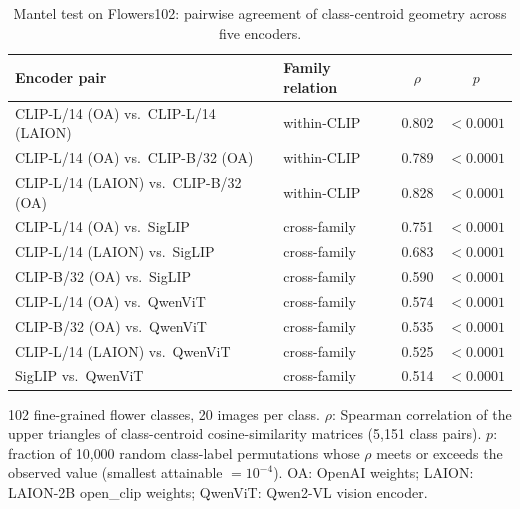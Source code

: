 \documentclass[a4paper,fleqn]{cas-sc}
\begin{document}
\begin{table}[h]
\centering
\caption{Mantel test on Flowers102: pairwise agreement of class-centroid geometry across five encoders.}
\label{tab:flowers102}
\small
\begin{tabular}{llcc}
\toprule
Encoder pair & Family relation & $\rho$ & $p$ \\
\midrule
CLIP-L/14 (OA) vs.\ CLIP-L/14 (LAION) & within-CLIP & 0.802 & $<0.0001$ \\
CLIP-L/14 (OA) vs.\ CLIP-B/32 (OA) & within-CLIP & 0.789 & $<0.0001$ \\
CLIP-L/14 (LAION) vs.\ CLIP-B/32 (OA) & within-CLIP & 0.828 & $<0.0001$ \\
CLIP-L/14 (OA) vs.\ SigLIP & cross-family & 0.751 & $<0.0001$ \\
CLIP-L/14 (LAION) vs.\ SigLIP & cross-family & 0.683 & $<0.0001$ \\
CLIP-B/32 (OA) vs.\ SigLIP & cross-family & 0.590 & $<0.0001$ \\
CLIP-L/14 (OA) vs.\ QwenViT & cross-family & 0.574 & $<0.0001$ \\
CLIP-B/32 (OA) vs.\ QwenViT & cross-family & 0.535 & $<0.0001$ \\
CLIP-L/14 (LAION) vs.\ QwenViT & cross-family & 0.525 & $<0.0001$ \\
SigLIP vs.\ QwenViT & cross-family & 0.514 & $<0.0001$ \\
\bottomrule
\end{tabular}

\vspace{2pt}
{\footnotesize 102 fine-grained flower classes, 20 images per class. $\rho$: Spearman correlation of the upper triangles of class-centroid cosine-similarity matrices (5{,}151 class pairs). $p$: fraction of 10{,}000 random class-label permutations whose $\rho$ meets or exceeds the observed value (smallest attainable $=10^{-4}$). OA: OpenAI weights; LAION: LAION-2B open\_clip weights; QwenViT: Qwen2-VL vision encoder.}
\end{table}
\end{document}
